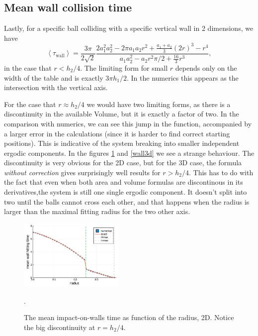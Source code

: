 \documentclass[superscriptaddress,pre,reprint,showpacs,twocolumn]{revtex4-1}
\newcommand{\mean}[1]{\left \langle #1 \right \rangle}
\begin{document}
\subsection{Mean wall collision time}

Lastly, for a specific ball colliding with a specific vertical wall
in 2 dimensions, we have
\begin{equation}\label{impactwall}
 \mean{\tau_\text{wall}} = 	
\frac{3 \pi}{2\sqrt{2}}
\frac { 2a_1^2 a_2^2  -  2\pi a_1 a_2 r^2 + \frac{a_1+a_2}{3}(2r)^3 - r^4}
{a_1a_2^2-a_2 r^2\pi/2 + \frac{16}{3} r^3 },
\end{equation}
in the case that $r<h_2/4$. The limiting form for small $r$ depends
only on the width of the table and is exactly
$3\pi h_1/2$. In the numerics this appears as the intersection with the vertical
axis.

For the case that $r\approx h_2/4$ we would have two limiting forms,
as there is a discontinuity in the available Volume, but it is exactly
a factor of two. In the comparison with numerics, we can see
this jump in the function, accompanied by a larger error in the
calculations (since it is harder to find correct starting positions). 
This is indicative of 
the system breaking into smaller independent ergodic components.
In the figures \ref{wall2d} and \ref{wall3d} we see a strange
behaviour. The discontinuity is very obvious for the 2D case,
but for the 3D case, the formula \emph{without correction}
gives surprisingly well results for $r > h_2/4$. This has to
do with the fact that even when both area and volume
formulas are discontinous in its derivatives,the system is still
one single ergodic component. It doesn't split into two until
the balls cannot cross each other, and that happens when
the radius is larger than the maximal fitting radius for
the two other axis. 

\begin{figure}[h]
  \centering
  \includegraphics[width=0.45\textwidth]{./figures/wall2d.pdf}
  \caption{The mean impact-on-walls time as function of the radius, 2D.
    Notice the big discontinuity at $r=h_2/4$.}
    \label{wall2d}.
\end{figure}
\end{document}

